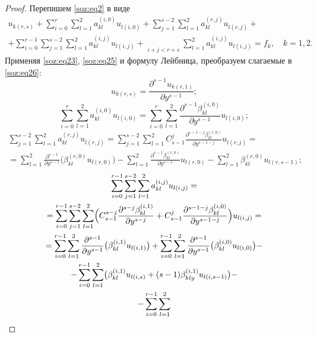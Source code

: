\begin{proof}
Перепишем \eqref{soz:eq2}  в виде
\begin{multline}
u_{k(r,s)}+\sum\limits_{i=0}^{r}\sum\limits_{l=1}^{2} a_{kl}^{(i,0)}u_{l(i,0)}+
\sum\limits_{j=1}^{s-2}\sum\limits_{l=1}^{2}a_{kl}^{(r,j)}u_{l(r,j)}+
\\
+\sum\limits_{i=0}^{r-1}\sum\limits_{j=1}^{s-2}\sum\limits_{l=1}^{2}a_{kl}^{(i,j)}u_{l(i,j)}+
\mathop{\sum\limits_{i=0}^{r}\sum\limits_{j=s-1}^{s}}\limits_{i + j < r+s}\sum\limits_{l=1}^{2} a_{kl}^{(i,j)}u_{l(i,j)}=f_{k}, \quad  k=1, 2.
\label{soz:eq26}
\end{multline}
Применяя \eqref{soz:eq23}, \eqref{soz:eq25}  и формулу Лейбница, преобразуем слагаемые в \eqref{soz:eq26}:
$$
u_{k(r,s)}=\frac{\partial^{s-1}u_{k(r,1)}}{\partial y^{s-1}};
$$
$$
\sum\limits_{i=0}^{r}\sum\limits_{l=1}^{2}a_{kl}^{(i,0)}u_{l(i,0)}=\sum\limits_{i=0}^{r}\sum\limits_{l=1}^{2}\frac{\partial^{s-1}\beta_{kl}^{(i,0)}}{\partial y^{s-1}}u_{l(i,0)};
$$
\begin{multline}
\sum\limits_{j=1}^{s-2}\sum\limits_{l=1}^{2}a_{kl}^{(r,j)}u_{l(r,j)}=\sum\limits_{j=1}^{s-2}\sum\limits_{l=1}^{2}C_{s-1}^{j}\frac{\partial^{s-1-j}\beta_{kl}^{(r,0)}}{\partial y^{s-1-j}}u_{l(r,j)}=
\\
=\sum\limits_{l=1}^{2}\frac{\partial^{s-1}}{\partial y^{s-1}}
\bigl(\beta_{kl}^{(r,0)}u_{l(r,0)}\bigr)-\sum\limits_{l=1}^{2}\frac{\partial^{s-1}\beta_{kl}^{(r,0)}}{\partial y^{s-1}}u_{l(r,0)}-\sum\limits_{l=1}^{2}\beta_{kl}^{(r,0)}u_{l(r,s-1)};
\label{soz:eq27}
\end{multline}
\begin{multline}
\sum\limits_{i=0}^{r-1}\sum\limits_{j=1}^{s-2}\sum\limits_{l=1}^{2}a_{kl}^{(i,j)}u_{l(i,j)}
=
\\
=\sum\limits_{i=0}^{r-1}\sum\limits_{j=1}^{s-2}\sum\limits_{l=1}^{2}
\Bigl(C_{s-1}^{s-j}
\frac{\partial^{s-j}\beta_{kl}^{(i,1)}}{\partial y^{s-j}}+
C_{s-1}^{j}\frac{\partial^{s-1-j}\beta_{kl}^{(i,0)}}{\partial y^{s-1-j}}\Bigr)u_{l(i,j)}=
\\
=
\sum\limits_{i=0}^{r-1}\sum\limits_{l=1}^{2}
\frac{\partial^{s-1}}{\partial y^{s-1}}
\bigl(\beta_{kl}^{(i,1)}u_{l(i,1)}\bigr)+
\sum\limits_{i=0}^{r-1}\sum\limits_{l=1}^{2}\frac{\partial^{s-1}}{\partial y^{s-1}}
\bigl(\beta_{kl}^{(i,0)}u_{l(i,0)}\bigr)-
\\
-
\sum\limits_{i=0}^{r-1}\sum\limits_{l=1}^{2}
\bigl(\beta_{kl}^{(i,1)}u_{l(i,s)}+(s-1)\beta_{kly}^{(i,1)}u_{l(i,s-1)} \bigr)-
\\
-
\sum\limits_{i=0}^{r-1}\sum\limits_{l=1}^{2}

\end{multline}
\end{proof}

